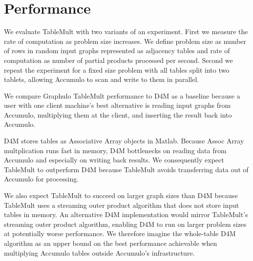
\section{Performance}
\label{sPerformance}

We evaluate TableMult with two variants of an experiment. 
First we measure the rate of computation as problem size increases.
We define problem size as number of rows in random input graphs 
represented as adjacency tables
and rate of computation as number of partial products processed per second.
Second we repeat the experiment for a fixed size problem with all tables split into two tablets,
allowing Accumulo to scan and write to them in parallel.



We compare Graphulo TableMult performance to D4M as a baseline because 
a user with one client machine's best alternative is reading input graphs from Accumulo, 
multiplying them at the client, and inserting the result back into Accumulo.

D4M stores tables as Associative Array objects in Matlab.  
Because Assoc Array multplication runs fast in memory, 
D4M bottlenecks on reading data from Accumulo and especially on writing back results.
We consequently expect TableMult to outperform D4M 
because TableMult avoids transferring data out of Accumulo for processing. 

We also expect TableMult to succeed on larger graph sizes than D4M because TableMult
uses a streaming outer product algorithm that does not store input tables in memory.
An alternative D4M implementation would mirror TableMult's streaming outer product algorithm,
enabling D4M to run on larger problem sizes at potentially worse performance.
We therefore imagine the whole-table D4M algorithm as an upper bound on the best performance 
achievable when multiplying Accumulo tables outside Accumulo's infrastructure.

